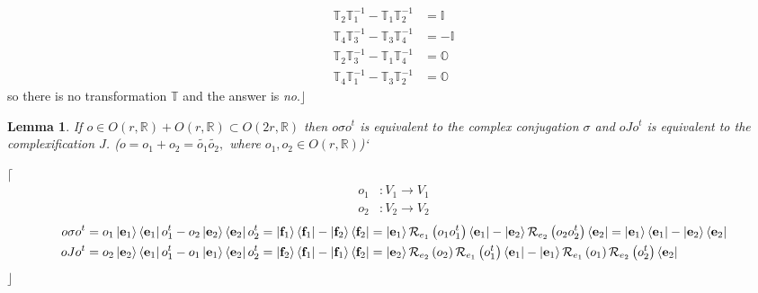 \documentclass[aps,preprint]{revtex4}
\newtheorem{lemma}[theorem]{Lemma}
\begin{document}
\begin{align}
\mathbb{T}_{2}\mathbb{T}_{1}^{-1}-\mathbb{T}_{1}\mathbb{T}_{2}^{-1}& =%
\mathbb{I} \\
\mathbb{T}_{4}\mathbb{T}_{3}^{-1}-\mathbb{T}_{3}\mathbb{T}_{4}^{-1}& =-%
\mathbb{I} \\
\mathbb{T}_{2}\mathbb{T}_{3}^{-1}-\mathbb{T}_{1}\mathbb{T}_{4}^{-1}& =%
\mathbb{O} \\
\mathbb{T}_{4}\mathbb{T}_{1}^{-1}-\mathbb{T}_{3}\mathbb{T}_{2}^{-1}& =%
\mathbb{O}
\end{align}%
so there is no transformation $\mathbb{T}$ and the answer is \emph{no}$%
.\rfloor $

\begin{lemma}
If $o\in O\left( r,\mathbb{R}\right) +O\left( r,\mathbb{R}\right) \subset
O\left( 2r,\mathbb{R}\right) $ then $o\sigma o^{t}$ is \emph{equivalent} to
the complex conjugation $\sigma$ and $oJo^{t}$ is \emph{equivalent} to the
complexification $J$. ($o=o_{1}+o_{2}=\widetilde{o_{1}}\widetilde{o_{2}},$
where $o_{1},o_{2}\in O\left( r,\mathbb{R}\right) $)`
\end{lemma}

$\lceil$%
\begin{align}
o_{1} & :V_{1}\rightarrow V_{1} \\
o_{2} & :V_{2}\rightarrow V_{2}
\end{align}%
\begin{align}
o\sigma o^{t} & =o_{1}\left\vert \mathbf{e}_{1}\right\rangle \left\langle 
\mathbf{e}_{1}\right\vert o_{1}^{t}-o_{2}\left\vert \mathbf{e}%
_{2}\right\rangle \left\langle \mathbf{e}_{2}\right\vert
o_{2}^{t}=\left\vert \mathbf{f}_{1}\right\rangle \left\langle \mathbf{f}%
_{1}\right\vert -\left\vert \mathbf{f}_{2}\right\rangle \left\langle \mathbf{%
f}_{2}\right\vert =\left\vert \mathbf{e}_{1}\right\rangle \mathcal{R}%
_{e_{1}}\left( o_{1}o_{1}^{t}\right) \left\langle \mathbf{e}_{1}\right\vert
-\left\vert \mathbf{e}_{2}\right\rangle \mathcal{R}_{e_{2}}\left(
o_{2}o_{2}^{t}\right) \left\langle \mathbf{e}_{2}\right\vert =\left\vert 
\mathbf{e}_{1}\right\rangle \left\langle \mathbf{e}_{1}\right\vert
-\left\vert \mathbf{e}_{2}\right\rangle \left\langle \mathbf{e}%
_{2}\right\vert \\
oJo^{t} & =o_{2}\left\vert \mathbf{e}_{2}\right\rangle \left\langle \mathbf{e%
}_{1}\right\vert o_{1}^{t}-o_{1}\left\vert \mathbf{e}_{1}\right\rangle
\left\langle \mathbf{e}_{2}\right\vert o_{2}^{t}=\left\vert \mathbf{f}%
_{2}\right\rangle \left\langle \mathbf{f}_{1}\right\vert -\left\vert \mathbf{%
f}_{1}\right\rangle \left\langle \mathbf{f}_{2}\right\vert =\left\vert 
\mathbf{e}_{2}\right\rangle \mathcal{R}_{e_{2}}\left( o_{2}\right) \mathcal{R%
}_{e_{1}}\left( o_{1}^{t}\right) \left\langle \mathbf{e}_{1}\right\vert
-\left\vert \mathbf{e}_{1}\right\rangle \mathcal{R}_{e_{1}}\left(
o_{1}\right) \mathcal{R}_{e_{2}}\left( o_{2}^{t}\right) \left\langle \mathbf{%
e}_{2}\right\vert
\end{align}
$\rfloor$
\end{document}
